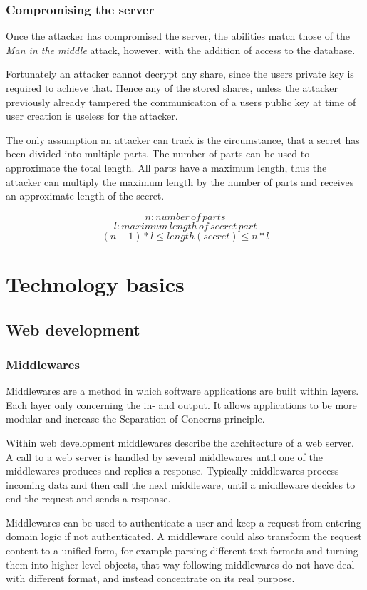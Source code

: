 \subsection{Compromising the server}

Once the attacker has compromised the server, the abilities match those of the
\textit{Man in the middle} attack, however, with the addition of access to the
database.

Fortunately an attacker cannot decrypt any share, since the users private key
is required to achieve that. Hence any of the stored shares, unless the
attacker previously already tampered the communication of a users public key at
time of user creation is useless for the attacker.

The only assumption an attacker can track is the circumstance, that a secret
has been divided into multiple parts. The number of parts can be used to
approximate the total length. All parts have a maximum length, thus the
attacker can multiply the maximum length by the number of parts and receives an
approximate length of the secret.

$$n: number\,of\,parts$$
$$l: maximum\,length\,of\,secret\,part$$
$$(n - 1) * l \leq length(secret) \leq n * l$$

\chapter{Technology basics}
\section{Web development}
\subsection{Middlewares}

Middlewares are a method in which software applications are built within
layers. Each layer only concerning the in- and output. It allows applications
to be more modular and increase the Separation of Concerns principle.

Within web development middlewares describe the architecture of a web server.  A
call to a web server is handled by several middlewares until one of the
middlewares produces and replies a response. Typically middlewares process
incoming data and then call the next middleware, until a middleware decides to
end the request and sends a response.

Middlewares can be used to authenticate a user and keep a request from entering
domain logic if not authenticated. A middleware could also transform the
request content to a unified form, for example parsing different text formats
and turning them into higher level objects, that way following middlewares do
not have deal with different format, and instead concentrate on its real
purpose.


